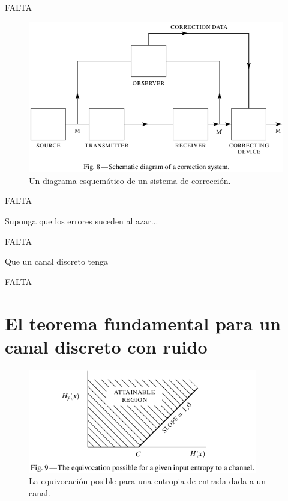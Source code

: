 FALTA

\begin{figure}[!ht]
\centerline{\includegraphics[width=120mm]{Imagenes/Pagina21-Figura8.png}}
\caption{Un diagrama esquem\'{a}tico de un sistema de correcci\'{o}n.}
\label{fig:8}
\end{figure}

FALTA

\begin{exmp}
Suponga que los errores suceden al azar...
\end{exmp}

FALTA

\begin{theorem}
\label{th:11}
Que un canal discreto tenga
\end{theorem}

FALTA

\clearpage

\chapter{El teorema fundamental para un canal discreto con ruido}
\label{sec:13}

\begin{figure}[!ht]
\centerline{\includegraphics[width=100mm]{Imagenes/Pagina22-Figura9.png}}
\caption{La equivocaci\'{o}n posible para una entropia de entrada dada
  a un canal.}
\label{fig:9}
\end{figure}

